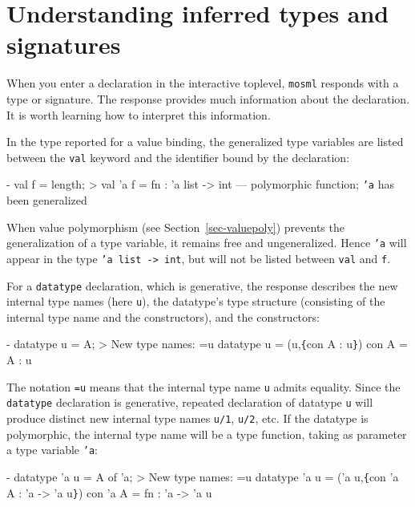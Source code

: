 \documentclass[fleqn,a4paper]{article}
\begin{document}
\newpage

\section{Understanding inferred types and signatures}

When you enter a declaration in the interactive toplevel,
\texttt{mosml} responds with a type or signature.  The response
provides much information about the declaration.  It is worth learning
how to interpret this information.

In the type reported for a value binding, the generalized type
variables are listed between the \texttt{val} keyword and the
identifier bound by the declaration:

\begin{program}
- val f = length;
> val 'a f = fn : 'a list -> int        \rm{--- polymorphic function; \texttt{'a} has been generalized}
\end{program}

\noindent When value polymorphism (see
Section~\ref{sec-valuepoly}) prevents the generalization of a type
variable, it remains free and ungeneralized.  Hence \texttt{'a} will
appear in the type \texttt{'a list -> int}, but will not be listed
between \texttt{val} and \texttt{f}.

For a \texttt{datatype} declaration, which is generative, the response
describes the new internal type names (here \texttt{u}), the
datatype's type structure (consisting of the internal type name and
the constructors), and the constructors:

\begin{program}
- datatype u = A;
> New type names: =u
  datatype u = (u,\verb+{+con A : u\verb+}+)
  con A = A : u
\end{program}

\noindent
The notation \texttt{=u} means that the internal type name \texttt{u}
admits equality.  Since the \texttt{datatype} declaration is
generative, repeated declaration of datatype \texttt{u} will produce
distinct new internal type names \texttt{u/1}, \texttt{u/2}, etc.  If
the datatype is polymorphic, the internal type name will be a type
function, taking as parameter a type variable \texttt{'a}:

\begin{program}
- datatype 'a u = A of 'a;
> New type names: =u
  datatype 'a u = ('a u,\verb+{+con 'a A : 'a -> 'a u\verb+}+)
  con 'a A = fn : 'a -> 'a u
\end{program}
\end{document}
